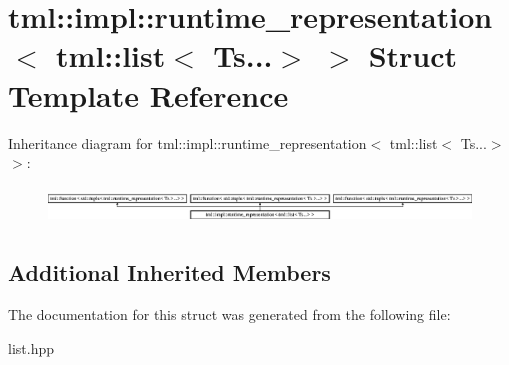 \hypertarget{structtml_1_1impl_1_1runtime__representation_3_01tml_1_1list_3_01Ts_8_8_8_4_01_4}{\section{tml\+:\+:impl\+:\+:runtime\+\_\+representation$<$ tml\+:\+:list$<$ Ts...$>$ $>$ Struct Template Reference}
\label{structtml_1_1impl_1_1runtime__representation_3_01tml_1_1list_3_01Ts_8_8_8_4_01_4}
}
Inheritance diagram for tml\+:\+:impl\+:\+:runtime\+\_\+representation$<$ tml\+:\+:list$<$ Ts...$>$ $>$\+:\begin{figure}[H]
\begin{center}
\leavevmode
\includegraphics[height=0.990274cm]{structtml_1_1impl_1_1runtime__representation_3_01tml_1_1list_3_01Ts_8_8_8_4_01_4}
\end{center}
\end{figure}
\subsection*{Additional Inherited Members}


The documentation for this struct was generated from the following file\+:\begin{DoxyCompactItemize}
\item 
list.\+hpp\end{DoxyCompactItemize}
